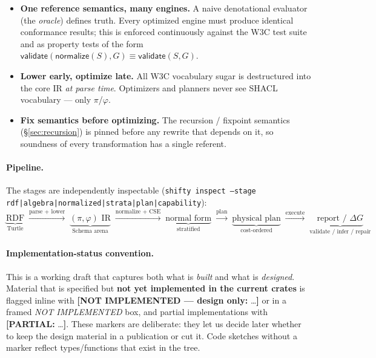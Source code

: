\documentclass[11pt]{article}
\newcommand{\code}[1]{\texttt{#1}}
\theoremstyle{definition}
\newcommand{\NI}[1]{{\color{nired}\textbf{[NOT IMPLEMENTED --- design only:} #1\textbf{]}}}
\newcommand{\PART}[1]{{\color{nired}\textbf{[PARTIAL:} #1\textbf{]}}}
\begin{document}
\begin{itemize}[leftmargin=1.4em]
  \item \textbf{One reference semantics, many engines.} A naive denotational
  evaluator (the \emph{oracle}) defines truth. Every optimized engine must
  produce identical conformance results; this is enforced continuously against
  the W3C test suite and as property tests of the form
  $\mathsf{validate}(\mathsf{normalize}(S),G) \equiv \mathsf{validate}(S,G)$.
  \item \textbf{Lower early, optimize late.} All W3C vocabulary sugar is
  destructured into the core IR \emph{at parse time}. Optimizers and planners
  never see SHACL vocabulary --- only $\pi$/$\varphi$.
  \item \textbf{Fix semantics before optimizing.} The recursion / fixpoint
  semantics (\S\ref{sec:recursion}) is pinned before any rewrite that depends on
  it, so soundness of every transformation has a single referent.
\end{itemize}

\paragraph{Pipeline.} The stages are independently inspectable
(\code{shifty inspect --stage rdf|algebra|normalized|strata|plan|capability}):
\[
\underbrace{\text{RDF}}_{\text{Turtle}}
\;\xrightarrow{\text{parse + lower}}\;
\underbrace{(\pi,\varphi)\text{ IR}}_{\text{Schema arena}}
\;\xrightarrow{\text{normalize + CSE}}\;
\underbrace{\text{normal form}}_{\text{stratified}}
\;\xrightarrow{\text{plan}}\;
\underbrace{\text{physical plan}}_{\text{cost-ordered}}
\;\xrightarrow{\text{execute}}\;
\underbrace{\text{report / } \Delta G}_{\text{validate / infer / repair}}
\]

\paragraph{Implementation-status convention.} This is a working draft that
captures both what is \emph{built} and what is \emph{designed}. Material that is
specified but \textbf{not yet implemented in the current crates} is flagged
inline with \NI{\dots} or in a framed \emph{NOT IMPLEMENTED} box, and partial
implementations with \PART{\dots}. These markers are deliberate: they let us
decide later whether to keep the design material in a publication or cut it. Code
sketches without a marker reflect types/functions that exist in the tree.
\end{document}
